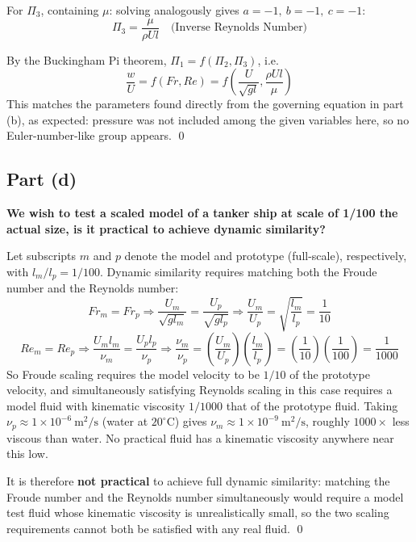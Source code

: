 \documentclass[12pt]{article}
\begin{document}
For $\Pi_3$, containing $\mu$: solving analogously gives $a = -1,\ b = -1,\ c = -1$:
\begin{equation}
    \Pi_3 = \frac{\mu}{\rho U l} \quad \text{(Inverse Reynolds Number)}
\end{equation}

By the Buckingham Pi theorem, $\Pi_1 = f(\Pi_2, \Pi_3)$, i.e.
\begin{equation}
    \boxed{
    \frac{w}{U} = f(Fr, Re) = f\left(\frac{U}{\sqrt{gl}}, \frac{\rho U l}{\mu}\right)
    }
\end{equation}
This matches the parameters found directly from the governing equation in part (b), as expected: pressure was not included among the given variables here, so no Euler-number-like group appears. \qed
\subsection*{Part (d)}
\textbf{We wish to test a scaled model of a tanker ship at scale of 1/100 the actual size, is it practical to achieve dynamic similarity?}

Let subscripts $m$ and $p$ denote the model and prototype (full-scale), respectively, with $l_m/l_p = 1/100$. Dynamic similarity requires matching both the Froude number and the Reynolds number:
\begin{equation*}
    Fr_m = Fr_p \Rightarrow \frac{U_m}{\sqrt{g l_m}} = \frac{U_p}{\sqrt{g l_p}} \Rightarrow \frac{U_m}{U_p} = \sqrt{\frac{l_m}{l_p}} = \frac{1}{10}
\end{equation*}
\begin{equation*}
    Re_m = Re_p \Rightarrow \frac{U_m l_m}{\nu_m} = \frac{U_p l_p}{\nu_p} \Rightarrow \frac{\nu_m}{\nu_p} = \left(\frac{U_m}{U_p}\right)\left(\frac{l_m}{l_p}\right) = \left(\frac{1}{10}\right)\left(\frac{1}{100}\right) = \frac{1}{1000}
\end{equation*}
So Froude scaling requires the model velocity to be $1/10$ of the prototype velocity, and 
simultaneously satisfying Reynolds scaling in this case requires a model fluid with kinematic 
viscosity $1/1000$ that of the prototype fluid. Taking 
$\nu_p \approx 1\times10^{-6}\ \text{m}^2/\text{s}$ (water at $20^\circ$C) gives 
$\nu_m \approx 1\times10^{-9}\ \text{m}^2/\text{s}$, roughly $1000\times$ less viscous than 
water. No practical fluid has a kinematic viscosity anywhere near this low.

It is therefore \textbf{not practical} to achieve full dynamic similarity: matching the Froude 
number and the Reynolds number simultaneously would require a model test fluid whose kinematic 
viscosity is unrealistically small, so the two scaling requirements cannot both be satisfied 
with any real fluid. \qed
\end{document}
